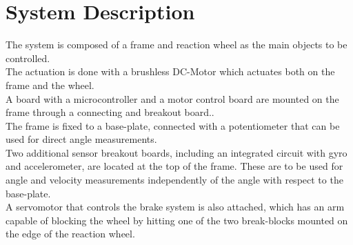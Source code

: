 \chapter{System Description}\label{systemDescription}
The system is composed of a frame and reaction wheel as the main objects to be controlled.\\
The actuation is done with a brushless DC-Motor which actuates both on the frame and the wheel.\\ 
A board with a microcontroller and a motor control board are mounted on the frame through a connecting and breakout board..\\ 
The frame is fixed to a base-plate, connected with a potentiometer that can be used for direct angle measurements.\\ 
Two additional sensor breakout boards, including an integrated circuit with gyro and accelerometer, are located at the top of the frame. These are to be used for angle and velocity measurements independently of the angle with respect to the base-plate.\\ 
A servomotor that controls the brake system is also attached, which has an arm capable of blocking the wheel by hitting one of the two break-blocks mounted on the edge of the reaction wheel.

